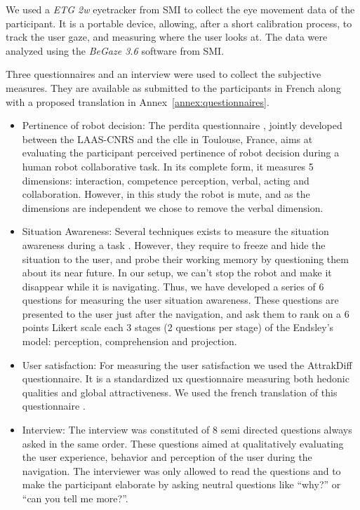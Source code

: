 \documentclass[a4paper,11pt,twoside]{StyleThese}
\begin{document}
We used a \textit{ETG 2w} eyetracker from SMI to collect the eye movement data of the participant. It is a portable device, allowing, after a short calibration process, to track the user gaze, and measuring where the user looks at. The data were analyzed using the \textit{BeGaze 3.6} software from SMI.

Three questionnaires and an interview were used to collect the subjective measures. They are available as submitted to the participants in French along with a proposed translation in Annex~\ref{annex:questionnaires}.
\begin{itemize}
\item Pertinence of robot decision: The \acrfull{perdita} questionnaire \cite{devin_evaluating_2018}, jointly developed between the LAAS-CNRS and the \acrshort{clle} in Toulouse, France, aims at evaluating the participant perceived pertinence of robot decision during a human robot collaborative task. In its complete form, it measures 5 dimensions: interaction, competence perception, verbal, acting and collaboration. However, in this study the robot is mute, and as the dimensions are independent we chose to remove the verbal dimension.
\item Situation Awareness: Several techniques exists to measure the situation awareness during a task \cite{endsley_design_1988}. However, they require to freeze and hide the situation to the user, and probe their working memory by questioning them about its near future. In our setup, we can't stop the robot and make it disappear while it is navigating. Thus, we have developed a series of 6 questions for measuring the user situation awareness. These questions are presented to the user just after the navigation, and ask them to rank on a 6 points Likert scale each 3 stages (2 questions per stage) of the Endsley's model: perception, comprehension and projection.
\item User satisfaction: For measuring the user satisfaction we used the AttrakDiff questionnaire. It is a standardized \acrfull{ux} questionnaire measuring both hedonic qualities and global attractiveness. We used the french translation of this questionnaire \cite{lallemand_creation_2015}.
\item Interview: The interview was constituted of 8 semi directed questions always asked in the same order. These questions aimed at qualitatively evaluating the user experience, behavior and perception of the user during the navigation. The interviewer was only allowed to read the questions and to make the participant elaborate by asking neutral questions like ``why?'' or ``can you tell me more?''.
\end{itemize}
\end{document}
